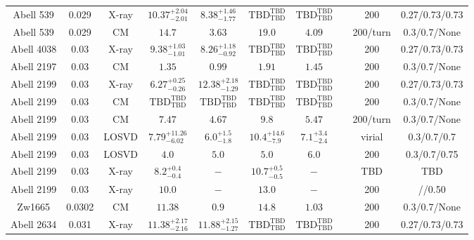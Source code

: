 \begin{table}
\begin{tabular}{cccccccccc}
Abell 539 & 0.029 & X-ray & ${10.37}^{+2.04}_{-2.01}$ & ${8.38}^{+1.46}_{-1.77}$ & ${\mathrm{TBD}}^{\mathrm{TBD}}_{\mathrm{TBD}}$ & ${\mathrm{TBD}}^{\mathrm{TBD}}_{\mathrm{TBD}}$ & \citet{BA14.1} & 200 & 0.27/0.73/0.73 \\
Abell 539 & 0.029 & CM & ${14.7}^{}_{}$ & ${3.63}^{}_{}$ & ${19.0}^{}_{}$ & ${4.09}^{}_{}$ & \citet{RI03.1} & 200/turn & 0.3/0.7/None \\
Abell 4038 & 0.03 & X-ray & ${9.38}^{+1.03}_{-1.01}$ & ${8.26}^{+1.18}_{-0.92}$ & ${\mathrm{TBD}}^{\mathrm{TBD}}_{\mathrm{TBD}}$ & ${\mathrm{TBD}}^{\mathrm{TBD}}_{\mathrm{TBD}}$ & \citet{BA14.1} & 200 & 0.27/0.73/0.73 \\
Abell 2197 & 0.03 & CM & ${1.35}^{}_{}$ & ${0.99}^{}_{}$ & ${1.91}^{}_{}$ & ${1.45}^{}_{}$ & \citet{RI06.1} & 200 & 0.3/0.7/None \\
Abell 2199 & 0.03 & X-ray & ${6.27}^{+0.25}_{-0.26}$ & ${12.38}^{+2.18}_{-1.29}$ & ${\mathrm{TBD}}^{\mathrm{TBD}}_{\mathrm{TBD}}$ & ${\mathrm{TBD}}^{\mathrm{TBD}}_{\mathrm{TBD}}$ & \citet{BA14.1} & 200 & 0.27/0.73/0.73 \\
Abell 2199 & 0.03 & CM & ${\mathrm{TBD}}^{\mathrm{TBD}}_{\mathrm{TBD}}$ & ${\mathrm{TBD}}^{\mathrm{TBD}}_{\mathrm{TBD}}$ & ${\mathrm{TBD}}^{\mathrm{TBD}}_{\mathrm{TBD}}$ & ${\mathrm{TBD}}^{\mathrm{TBD}}_{\mathrm{TBD}}$ & \citet{RI06.1} & 200 & 0.3/0.7/None \\
Abell 2199 & 0.03 & CM & ${7.47}^{}_{}$ & ${4.67}^{}_{}$ & ${9.8}^{}_{}$ & ${5.47}^{}_{}$ & \citet{RI03.1} & 200/turn & 0.3/0.7/None \\
Abell 2199 & 0.03 & LOSVD & ${7.79}^{+11.26}_{-6.02}$ & ${6.0}^{+1.5}_{-1.8}$ & ${10.4}^{+14.6}_{-7.9}$ & ${7.1}^{+3.4}_{-2.4}$ & \citet{LO06.1} & virial & 0.3/0.7/0.7 \\
Abell 2199 & 0.03 & LOSVD & ${4.0}^{}_{}$ & ${5.0}^{}_{}$ & ${5.0}^{}_{}$ & ${6.0}^{}_{}$ & \citet{KE02.2} & 200 & 0.3/0.7/0.75 \\
Abell 2199 & 0.03 & X-ray & ${8.2}^{+0.4}_{-0.4}$ & ${-}^{}_{}$ & ${10.7}^{+0.5}_{-0.5}$ & ${-}^{}_{}$ & \citet{XU01.1} & TBD & TBD \\
Abell 2199 & 0.03 & X-ray & ${10.0}^{}_{}$ & ${-}^{}_{}$ & ${13.0}^{}_{}$ & ${-}^{}_{}$ & \citet{MA99.1} & 200 & //0.50 \\
Zw1665 & 0.0302 & CM & ${11.38}^{}_{}$ & ${0.9}^{}_{}$ & ${14.8}^{}_{}$ & ${1.03}^{}_{}$ & \citet{RI06.1} & 200 & 0.3/0.7/None \\
Abell 2634 & 0.031 & X-ray & ${11.38}^{+2.17}_{-2.16}$ & ${11.88}^{+2.15}_{-1.27}$ & ${\mathrm{TBD}}^{\mathrm{TBD}}_{\mathrm{TBD}}$ & ${\mathrm{TBD}}^{\mathrm{TBD}}_{\mathrm{TBD}}$ & \citet{BA14.1} & 200 & 0.27/0.73/0.73 \\

\end{tabular}
\end{table}
